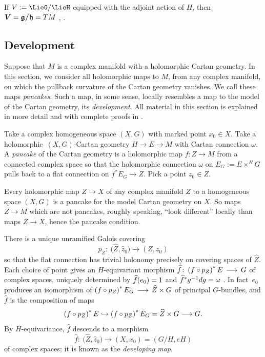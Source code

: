 \documentclass[11pt]{article}
\numberwithin{equation}{section}
\numberwithin{equation}{section}
\newcommand{\amal}[3]{\ensuremath{{#1} \mathbin{\times^{#2}} \! #3}}
\begin{document}
\begin{Example} If $V := \LieG/\LieH$ equipped with the adjoint action of $H$, then ${\bm{V}} = {\bm{{\mathfrak{g}/{\mathfrak{h}}}}} = TM$
\cite[Proposition 1]{mckay2023introduction}, \cite[Theorem 3.15]{Sharpe:1997}.
\end{Example}

\subsection{Development}\label{subsection:Development}
Suppose that $M$ is a complex manifold with a holomorphic Cartan geometry.
In this section, we consider all holomorphic maps to $M$, from any complex manifold, on which the pullback curvature of the Cartan geometry vanishes.
We call these maps \emph{pancakes}.
Such a map, in some sense, locally resembles a map to the model of the Cartan geometry, its \emph{development}.
All material in this section is explained in more detail and with complete proofs
in \cite[Section 7]{mckay2023introduction}.

Take a complex homogeneous space $(X, G)$ with marked point $x_0 \in X$.
Take a holomorphic~$(X, G)$-Cartan geometry $H \longrightarrow
E \to M$ with Cartan connection $\omega$.
A \emph{pancake} of the Cartan geometry is a holomorphic map $f \colon Z \longrightarrow
 M$ from a connected complex space so that the holomorphic connection $\omega$ on $E_G := \amal{E}{H}{G}$ pulls back to a flat
connection on $f^* E_G \to Z$. Pick a point $z_0 \in Z$.
\begin{Example}
Every holomorphic map $Z\to X$ of any complex manifold $Z$ to a homogeneous space $(X,G)$ is a pancake for the model Cartan geometry on $X$.
So maps $Z\to M$ which are not pancakes, roughly speaking, ``look different'' locally than maps $Z\to X$, hence the pancake condition.
\end{Example}
There is a unique unramified Galois covering
\[
p_Z \colon \ \big(\widehat{Z}, \widehat{z}_0\big) \to (Z, z_0)
\]
so that the flat connection has trivial holonomy precisely on covering spaces of $\widehat{Z}$.
Each choice of point  gives an $H$-equivariant morphism $\widehat{f} \colon
 \left(f \circ p_Z\right)^*E \,\longrightarrow\, G$ of complex spaces, uniquely determined by
$
\widehat{f}\!\left(e_0\right) = 1
$
and $\widehat{f}^* g^{-1} {\rm d}g = \omega$ \cite[Section 2.3]{Biswas.McKay:2016}. In fact~$e_0$ produces an
isomorphism of $\left(f \circ p_Z\right)^*E_G \,\longrightarrow\, \widehat{Z}\times G$ of principal $G$-bundles, and
$\widehat{f}$ is the composition of maps
\[
\left(f \circ p_Z\right)^*E \hookrightarrow \left(f \circ p_Z\right)^*E_G = \widehat{Z}\times G \longrightarrow G.
\]
By $H$-equivariance, $\widehat{f}$ descends to a morphism
\begin{equation}\label{ed}
\widehat{f} \colon \ \big(\widehat{Z}, \widehat{z}_0\big)
\to (X, x_0) = (G/H, eH)
\end{equation}
of complex spaces; it is known as the \emph{developing map}.
\end{document}
